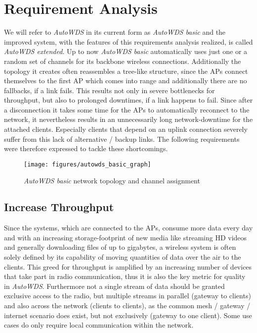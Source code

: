 \chapter{Requirement Analysis}
  \label{reqana}
  We will refer to \textit{AutoWDS} in its current form as \textit{AutoWDS basic} and the improved system, with the features of this requirements analysis realized, 
  is called \textit{AutoWDS extended}.
  Up to now \textit{AutoWDS basic} automatically uses just one or a random set of channels for its backbone wireless connections. 
  Additionally the topology it creates often reassembles a tree-like structure,
  since the APs connect themselves to the first \ac{AP} which comes into range and additionally there are no fallbacks, if a link fails. 
  This results not only in severe bottlenecks for throughput, but also to prolonged downtimes, if a link happens to fail.
  Since after a disconnection it takes some time for the APs to automatically reconnect to the network,
  it nevertheless results in an unnecessarily long network-downtime for the attached clients.
  Especially clients that depend on an uplink connection severely suffer from this lack of alternative / backup links. 
  The following requirements were therefore expressed to tackle these shortcomings.
  
  \begin{figure}[h!]
    \centering
    \texttt{[image: figures/autowds\_basic\_graph]}
    \caption{\textit{AutoWDS basic} network topology and channel assignment}
    \label{fig:autowds_basic_graph}
  \end{figure}

  \section{Increase Throughput}
    \label{reqincreasethroughput}
    Since the systems, which are connected to the APs, consume more data every day and with an increasing storage-footprint of new media like streaming \ac{HD} videos
    and generally downloading files of up to gigabytes, a wireless system is often solely defined by its capability of moving quantities of data over the air to the clients.
    This greed for throughput is amplified by an increasing number of devices that take part in radio communication, 
    thus it is also the key metric for quality in \textit{AutoWDS}. 
    Furthermore not a single stream of data should be granted exclusive access to the radio,
    but multiple streams in parallel (gateway to clients) and also across the network (clients to clients), 
    as the common mesh / gateway / internet scenario does exist, but not exclusively (gateway to one client).
    Some use cases do only require local communication within the network.
  
